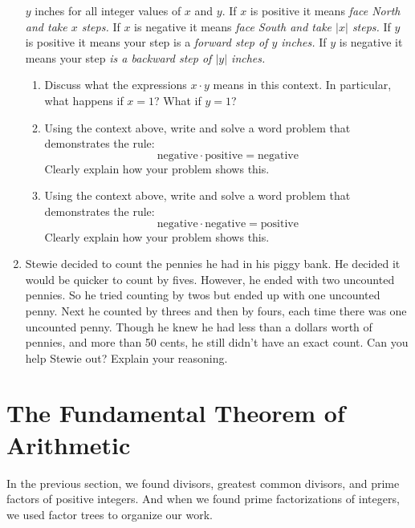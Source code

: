 \begin{problems}
\begin{enumerate}
  $y$ inches for all integer values of $x$ and $y$.  If $x$ is
  positive it means \textit{face North and take $x$ steps.} If $x$ is
  negative it means \textit{face South and take $|x|$ steps.} If $y$
  is positive it means your step is a \textit{forward step of $y$
    inches.} If $y$ is negative it means your step \textit{is a
    backward step of $|y|$ inches.}
\begin{enumerate}
\item Discuss what the expressions $x \cdot y$ means in this
  context. In particular, what happens if $x = 1$? What if $y=1$?
\item Using the context above, write and solve a word problem that
  demonstrates the rule:
\[
\text{negative}\cdot \text{positive} = \text{negative}
\]
Clearly explain how your problem shows this.
\item Using the context above, write and solve a word problem that
  demonstrates the rule:
\[
\text{negative}\cdot \text{negative} = \text{positive}
\]
Clearly explain how your problem shows this.
\end{enumerate}
\item Stewie decided to count the pennies he had in his piggy bank. He
  decided it would be quicker to count by fives. However, he ended
  with two uncounted pennies. So he tried counting by twos but ended
  up with one uncounted penny. Next he counted by threes and then by
  fours, each time there was one uncounted penny. Though he knew he
  had less than a dollars worth of pennies, and more than 50 cents, he
  still didn't have an exact count. Can you help Stewie out? Explain
  your reasoning.
\end{enumerate}
\end{problems}





\section{The Fundamental Theorem of Arithmetic}\label{S:FT}
In the previous section, we found divisors, greatest common divisors, and prime factors of positive integers.  And when we
 found prime factorizations of integers, we used factor trees to organize our work.  


